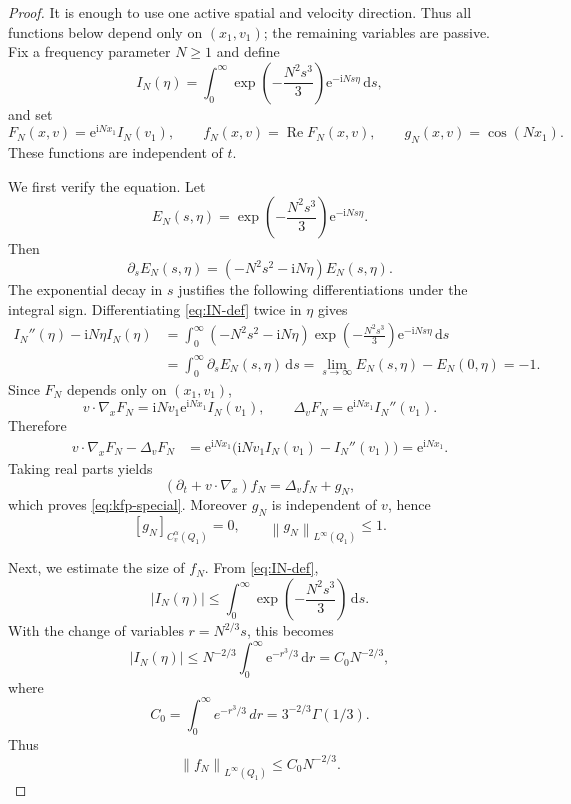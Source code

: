 \documentclass[10pt,a4paper]{amsart}
\numberwithin{equation}{section}
\newcommand{\ii}{\mathrm{i}}
\newcommand{\e}{\mathrm{e}}
\newcommand{\dd}{\,\mathrm{d}}
\newcommand{\norm}[1]{\left\|#1\right\|}
\begin{document}
\begin{proof}
It is enough to use one active spatial and velocity direction.  Thus all functions below depend only on $(x_1,v_1)$; the remaining variables are passive.  Fix a frequency parameter $N\ge1$ and define
\begin{equation}\label{eq:IN-def}
   I_N(\eta)=\int_0^\infty
      \exp\left(-\frac{N^2s^3}{3}\right)\e^{-\ii Ns\eta}\dd s,
\end{equation}
and set
\begin{equation}\label{eq:fN-gN-def}
   F_N(x,v)=\e^{\ii Nx_1}I_N(v_1),
   \qquad
   f_N(x,v)=\operatorname{Re}F_N(x,v),
   \qquad
   g_N(x,v)=\cos(Nx_1).
\end{equation}
These functions are independent of $t$.

We first verify the equation.  Let
\[
   E_N(s,\eta)=\exp\left(-\frac{N^2s^3}{3}\right)\e^{-\ii Ns\eta}.
\]
Then
\[
   \partial_sE_N(s,\eta)=(-N^2s^2-\ii N\eta)E_N(s,\eta).
\]
The exponential decay in $s$ justifies the following differentiations under the integral sign.  Differentiating \eqref{eq:IN-def} twice in $\eta$ gives
\[
\begin{aligned}
   I_N''(\eta)-\ii N\eta I_N(\eta)
   &=\int_0^\infty (-N^2s^2-\ii N\eta)
       \exp\left(-\frac{N^2s^3}{3}\right)\e^{-\ii Ns\eta}\dd s \\
   &=\int_0^\infty \partial_sE_N(s,\eta)\dd s
     =\lim_{s\to\infty}E_N(s,\eta)-E_N(0,\eta)=-1.
\end{aligned}
\]
Since $F_N$ depends only on $(x_1,v_1)$,
\[
   v\cdot\nabla_xF_N=\ii Nv_1\e^{\ii Nx_1}I_N(v_1),
   \qquad
   \Delta_vF_N=\e^{\ii Nx_1}I_N''(v_1).
\]
Therefore
\[
\begin{aligned}
   v\cdot\nabla_xF_N-\Delta_vF_N
   &=\e^{\ii Nx_1}\big(\ii Nv_1I_N(v_1)-I_N''(v_1)\big)
     =\e^{\ii Nx_1}.
\end{aligned}
\]
Taking real parts yields
\[
   (\partial_t+v\cdot\nabla_x)f_N=\Delta_vf_N+g_N,
\]
which proves \eqref{eq:kfp-special}.  Moreover $g_N$ is independent of $v$, hence
\[
   [g_N]_{C_v^\alpha(Q_1)}=0,
   \qquad
   \norm{g_N}_{L^\infty(Q_1)}\le1.
\]

Next, we estimate the size of $f_N$.  From \eqref{eq:IN-def},
\[
   |I_N(\eta)|\le \int_0^\infty \exp\left(-\frac{N^2s^3}{3}\right)\dd s.
\]
With the change of variables $r=N^{2/3}s$, this becomes
\[
   |I_N(\eta)|\le N^{-2/3}\int_0^\infty \e^{-r^3/3}\dd r
   = C_0N^{-2/3},
\]
where
\[
   C_0=\int_0^\infty e^{-r^3/3}\,dr=3^{-2/3}\Gamma(1/3).
\]
Thus
\begin{equation}\label{eq:fN-Linfty}
   \norm{f_N}_{L^\infty(Q_1)}\le C_0N^{-2/3}.
\end{equation}


\end{proof}
\end{document}
